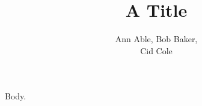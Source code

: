 \documentclass{article}
\begin{document}
\title{A Title}
\author{\begin{tabular}{c}Ann Able, Bob Baker,\\ Cid Cole\end{tabular}}
\maketitle
Body.
\end{document}
